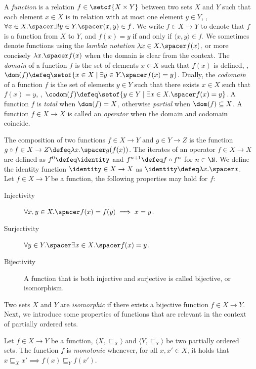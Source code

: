 A \emph{function} is a relation $f\in\setof{X \times Y}$ between two sets $X$ and $Y$ such that each element $x \in X$ is in relation with at most one element $y \in Y$, \ie, $\forall x \in X.\spacer \exists! y \in Y.\spacer (x, y) \in f$. We write $f \in X \to Y$ to denote that $f$ is a function from $X$ to $Y$, and $f(x) = y$ if and only if $\langle x, y \rangle \in f$.
We sometimes denote functions using the \emph{lambda notation} $\lambda x \in X.\spacer f(x)$, or more concisely $\lambda x.\spacer f(x)$ when the domain is clear from the context.
The \emph{domain} of a function $f$ is the set of elements $x \in X$ such that $f(x)$ is defined, \ie, $\dom(f) \defeq \setof{x \in X \mid \exists y \in Y.\spacer f(x) = y}$. Dually, the \emph{codomain} of a function $f$ is the set of elements $y \in Y$ such that there exists $x \in X$ such that $f(x) = y$, \ie, $\codom(f) \defeq \setof{y \in Y \mid \exists x \in X.\spacer f(x) = y}$. A function $f$ is \emph{total} when $\dom(f) = X$, otherwise \emph{partial} when $\dom(f) \subseteq X$.
A function $f\in X \to X$ is called an \emph{operator} when the domain and codomain coincide.

The {composition} of two functions $f \in X \to Y$ and $g \in Y \to Z$ is the function $g \circ f \in X \to Z \defeq \lambda x.\spacer g(f(x))$.
The {iterates} of an operator $f \in X \to X$ are defined as $f^0 \defeq \identity$ and $f^{n+1} \defeq f \circ f^n$ for $n \in \N$.
We define the {identity} function $\identity\in X \to X$ as $\identity \defeq \lambda x.\spacer x$.
Let $f \in X \to Y$ be a function, the following properties may hold for $f$:
\begin{description}
  \item[Injectivity] $\forall x, y \in X.\spacer f(x) = f(y) \implies x = y$.
  \item[Surjectivity] $\forall y \in Y.\spacer \exists x \in X.\spacer f(x) = y$.
  \item[Bijectivity] A function that is both injective and surjective is called bijective, or isomorphism.
\end{description}
Two sets $X$ and $Y$ are \emph{isomorphic} if there exists a bijective function $f \in X \to Y$.
%
Next, we introduce some properties of functions that are relevant in the context of partially ordered sets.

\begin{definition}[Monotonicity]
  Let $f\in X \to Y$ be a function, $\langle X, \sqsubseteq_X \rangle$ and $\langle Y, \sqsubseteq_Y \rangle$ be two partially ordered sets.
  The function $f$ is \emph{monotonic} whenever, for all $x, x' \in X$, it holds that $x \sqsubseteq_X x' \implies f(x) \sqsubseteq_Y f(x')$.
\end{definition}

